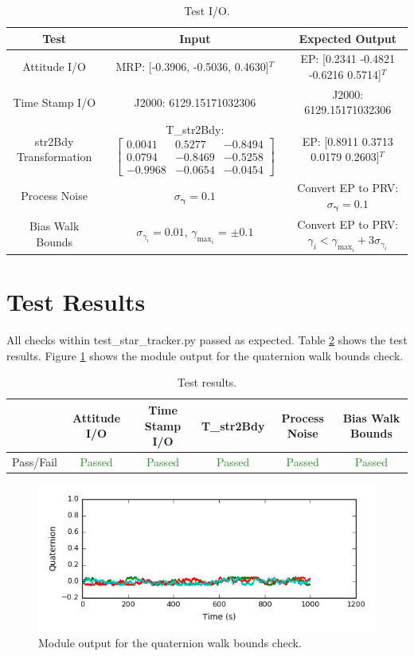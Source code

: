 \documentclass[]{BasiliskReportMemo}
\begin{document}
\begin{table}[htbp]
	\caption{Test I/O.}
	\label{tab:parameters}
	\centering \fontsize{10}{10}\selectfont
	\begin{tabular}{ c | c | c }
		\hline
		Test   & Input & Expected Output \\ \hline
		Attitude I/O & MRP: [-0.3906, -0.5036, 0.4630]$^T$ & EP: [0.2341   -0.4821   -0.6216    0.5714]$^T$ \\ \hline
		Time Stamp I/O & J2000: 6129.15171032306 & J2000: 6129.15171032306 \\ \hline
		str2Bdy Transformation & T\_str2Bdy: $\begin{bmatrix}0.0041 & 0.5277 & -0.8494 \\ 0.0794 & -0.8469 & -0.5258 \\ -0.9968 & -0.0654 & -0.0454 \end{bmatrix}$ & EP: [0.8911    0.3713    0.0179    0.2603]$^T$ \\ \hline
		Process Noise & $\sigma_{\bm{\gamma}} = 0.1$ & Convert EP to PRV: $\sigma_{\bm{\gamma}} = 0.1$\\ \hline
		Bias Walk Bounds & $\sigma_{\gamma_i} = 0.01$, $\gamma_{\text{max}_i}$ = $\pm 0.1$ & Convert EP to PRV: $\gamma_i < \gamma_{\text{max}_i} + 3 \sigma_{\gamma_i}$ \\ \hline
	\end{tabular}
\end{table}


\section{Test Results}

All checks within test\_star\_tracker.py passed as expected. Table \ref{tab:results} shows the test results. Figure \ref{fig:walkbounds} shows the module output for the quaternion walk bounds check.

\begin{table}[htbp]
	\caption{Test results.}
	\label{tab:results}
	\centering \fontsize{10}{10}\selectfont
	\begin{tabular}{c | c | c | c | c | c } %
		\hline
		   & Attitude I/O & Time Stamp I/O & T\_str2Bdy & Process Noise & Bias Walk Bounds \\
		\hline
		Pass/Fail & \textcolor{ForestGreen}{Passed} & \textcolor{ForestGreen}{Passed} &  \textcolor{ForestGreen}{Passed}&  \textcolor{ForestGreen}{Passed} & \textcolor{ForestGreen}{Passed}\\
		\hline
	\end{tabular}
\end{table}


\begin{figure}
	\centering
	\includegraphics[width=0.7\linewidth]{Figures/walkbounds}
	\caption{Module output for the quaternion walk bounds check.}
	\label{fig:walkbounds}
\end{figure}
\end{document}
